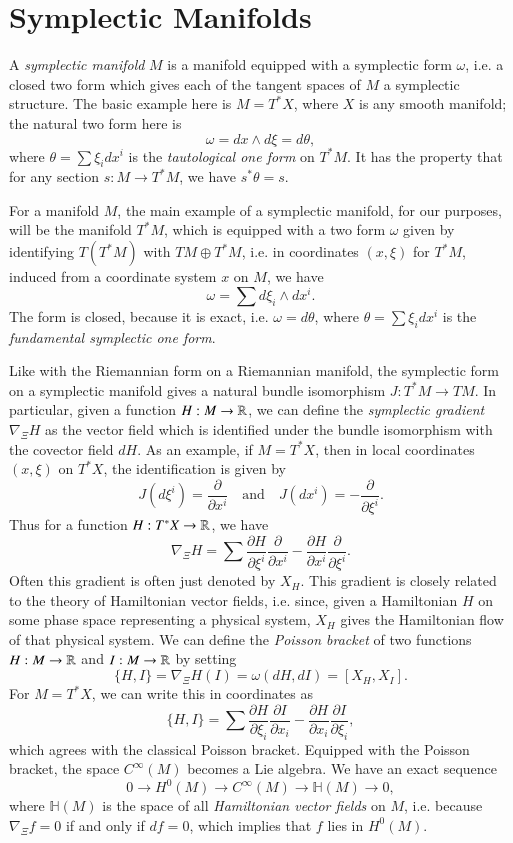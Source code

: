 \section{Symplectic Manifolds}

A \emph{symplectic manifold} $M$ is a manifold equipped with a symplectic form $\omega$, i.e. a closed two form which gives each of the tangent spaces of $M$ a symplectic structure. The basic example here is $M = T^* X$, where $X$ is any smooth manifold; the natural two form here is
%
\[ \omega = dx \wedge d\xi = d \theta, \]
%
where $\theta = \sum \xi_i dx^i$ is the \emph{tautological one form} on $T^* M$. It has the property that for any section $s: M \to T^* M$, we have $s^* \theta = s$.

\begin{example}
    For a manifold $M$, the main example of a symplectic manifold, for our purposes, will be the manifold $T^* M$, which is equipped with a two form $\omega$ given by identifying $T(T^* M)$ with $TM \oplus T^*M$, i.e. in coordinates $(x,\xi)$ for $T^* M$, induced from a coordinate system $x$ on $M$, we have
    \[ \omega = \sum d\xi_i \wedge dx^i. \]
    The form is closed, because it is exact, i.e. $\omega = d \theta$, where $\theta = \sum \xi_i dx^i$ is the \emph{fundamental symplectic one form}.
\end{example}

Like with the Riemannian form on a Riemannian manifold, the symplectic form on a symplectic manifold gives a natural bundle isomorphism $J: T^*M \to TM$. In particular, given a function $H : M \to \operatorname{\mathbb{R}}$, we can define the \emph{symplectic gradient} $\nabla_{\Xi} H$ as the vector field which is identified under the bundle isomorphism with the covector field $dH$. As an example, if $M = T^* X$, then in local coordinates $(x,\xi)$ on $T^* X$, the identification is given by
%
\[ J(d\xi^i) = \frac{\partial}{\partial x^i} \quad\text{and}\quad J \left( dx^i \right) = - \frac{\partial}{\partial \xi^i}. \]
%
Thus for a function $H: T^* X \to \operatorname{\mathbb{R}}$, we have
%
\[ \nabla_{\Xi} H = \sum \frac{\partial H}{\partial \xi^i} \frac{\partial}{\partial x^i} - \frac{\partial H}{\partial x^i} \frac{\partial}{\partial \xi^i}. \]
%
Often this gradient is often just denoted by $X_H$. This gradient is closely related to the theory of Hamiltonian vector fields, i.e. since, given a Hamiltonian $H$ on some phase space representing a physical system, $X_H$ gives the Hamiltonian flow of that physical system. We can define the \emph{Poisson bracket} of two functions $H: M \to \operatorname{\mathbb{R}}$ and $I: M \to \operatorname{\mathbb{R}}$ by setting
%
\[ \{ H, I \} = \nabla_\Xi H (I) = \omega(dH, dI) = [X_H, X_I]. \]
%
For $M = T^* X$, we can write this in coordinates as
%
\[ \{ H, I \} = \sum \frac{\partial H}{\partial \xi_i} \frac{\partial I}{\partial x_i} - \frac{\partial H}{\partial x_i} \frac{\partial I}{\partial \xi_i}, \]
%
which agrees with the classical Poisson bracket. Equipped with the Poisson bracket, the space $C^\infty(M)$ becomes a Lie algebra. We have an exact sequence
%
\[ 0 \to H^0(M) \to C^\infty(M) \to \mathbb{H}(M) \to 0, \]
%
where $\mathbb{H}(M)$ is the space of all \emph{Hamiltonian vector fields} on $M$, i.e. because $\nabla_\Xi f = 0$ if and only if $df = 0$, which implies that $f$ lies in $H^0(M)$.

